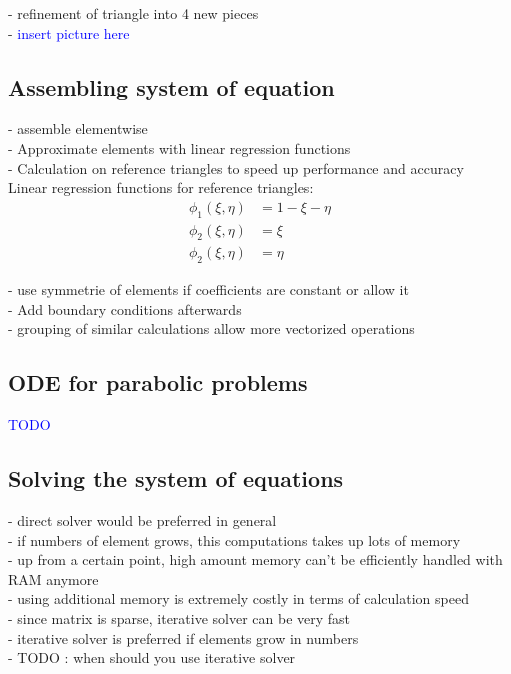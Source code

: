 \documentclass[parskip=half, titlepage=yes, 12pt, BCOR=12mm, DIV=calc]{scrartcl}
\begin{document}
- refinement of triangle into 4 new pieces \\
- \textcolor{blue}{insert picture here}

\subsection{Assembling system of equation}

- assemble elementwise \\
- Approximate elements with linear regression functions\\
- Calculation on reference triangles to speed up performance and accuracy \\

Linear regression functions for reference triangles:
\begin{align}
    \phi_1(\xi, \eta) &= 1 - \xi - \eta \\
    \phi_2(\xi, \eta) &= \xi \\
    \phi_2(\xi, \eta) &= \eta 
\end{align}

- use symmetrie of elements if coefficients are constant or allow it \\
- Add boundary conditions afterwards \\
- grouping of similar calculations allow more vectorized operations \\ 

\subsection{ODE for parabolic problems}

\textcolor{blue}{TODO}

\subsection{Solving the system of equations}
- direct solver would be preferred in general \\
- if numbers of element grows, this computations takes up lots of memory \\
- up from a certain point, high amount memory can't be efficiently handled with RAM anymore \\
- using additional memory is extremely costly in terms of calculation speed \\
- since matrix is sparse, iterative solver can be very fast \\
- iterative solver is preferred if elements grow in numbers \\
- TODO : when should you use iterative solver \\
\end{document}
